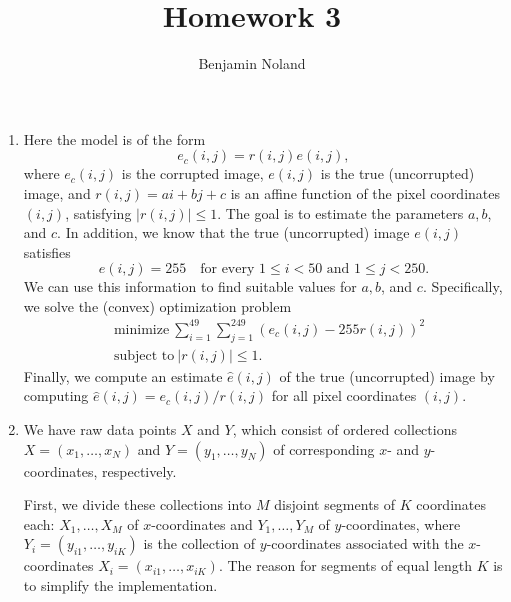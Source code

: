 \documentclass[letterpaper,12pt]{article}
\title{Homework 3}
\author{Benjamin Noland}
\date{}
\begin{document}
\maketitle

\begin{enumerate}
\item Here the model is of the form
  \begin{equation*}
    e_c(i, j) = r(i, j) e(i, j),
  \end{equation*}
  where $e_c(i, j)$ is the corrupted image, $e(i, j)$ is the true
  (uncorrupted) image, and $r(i, j) = ai + bj + c$ is an affine
  function of the pixel coordinates $(i, j)$, satisfying
  $|r(i, j)| \leq 1$. The goal is to estimate the parameters $a, b$,
  and $c$. In addition, we know that the true (uncorrupted) image
  $e(i, j)$ satisfies
  \begin{equation*}
    e(i, j) = 255 \quad \text{for every $1 \leq i < 50$ and $1 \leq j < 250$}.
  \end{equation*}
  We can use this information to find suitable values for $a, b$, and
  $c$. Specifically, we solve the (convex) optimization problem
  \begin{align*}
    &\text{minimize} \
      \sum_{i=1}^{49} \sum_{j=1}^{249} (e_c(i, j) - 255 r(i, j))^2 \\
    &\text{subject to} \ |r(i, j)| \leq 1.
  \end{align*}
  Finally, we compute an estimate $\hat{e}(i, j)$ of the true
  (uncorrupted) image by computing
  $\hat{e}(i, j) = e_c(i, j) / r(i, j)$ for all pixel coordinates
  $(i, j)$.

\item We have raw data points $X$ and $Y$, which consist of ordered
  collections $X = (x_1, \ldots, x_N)$ and $Y = (y_1, \ldots, y_N)$ of
  corresponding $x$- and $y$-coordinates, respectively.

  First, we divide these collections into $M$ disjoint segments of $K$
  coordinates each: $X_1, \ldots, X_M$ of $x$-coordinates and
  $Y_1, \ldots, Y_M$ of $y$-coordinates, where
  $Y_i = (y_{i1}, \ldots, y_{iK})$ is the collection of
  $y$-coordinates associated with the $x$-coordinates
  $X_i = (x_{i1}, \ldots, x_{iK})$. The reason for segments of equal
  length $K$ is to simplify the implementation.


\end{enumerate}
\end{document}
